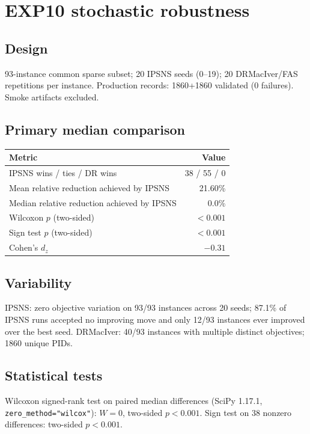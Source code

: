 \section{EXP10 stochastic robustness}
\label{sec:or1-exp10}

\subsection{Design}

93-instance common sparse subset; 20 IPSNS seeds (0--19); 20 DRMacIver/FAS repetitions per instance. Production records: 1860+1860 validated (0 failures). Smoke artifacts excluded.

\subsection{Primary median comparison}

\begin{center}
\begin{tabular}{lr}
\toprule
Metric & Value \\
\midrule
IPSNS wins / ties / DR wins & 38 / 55 / 0 \\
Mean relative reduction achieved by IPSNS & 21.60\% \\
Median relative reduction achieved by IPSNS & 0.0\% \\
Wilcoxon $p$ (two-sided) & $<0.001$ \\
Sign test $p$ (two-sided) & $<0.001$ \\
Cohen's $d_z$ & $-0.31$ \\
\bottomrule
\end{tabular}
\end{center}

\subsection{Variability}

IPSNS: zero objective variation on 93/93 instances across 20 seeds; 87.1\% of IPSNS runs accepted no improving move and only 12/93 instances ever improved over the best seed. DRMacIver: 40/93 instances with multiple distinct objectives; 1860 unique PIDs.

\subsection{Statistical tests}

Wilcoxon signed-rank test on paired median differences (SciPy 1.17.1, \texttt{zero\_method="wilcox"}): $W=0$, two-sided $p<0.001$. Sign test on 38 nonzero differences: two-sided $p<0.001$.

